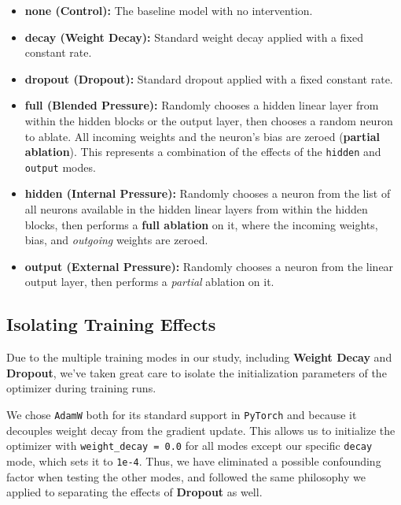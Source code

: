 \documentclass[conference]{IEEEtran}
\begin{document}
\begin{itemize}
    \item \textbf{none (Control):} The baseline model with no intervention.\\
    \item \textbf{decay (Weight Decay):} Standard weight decay applied with a fixed constant rate.\\
    \item \textbf{dropout (Dropout): } Standard dropout applied with a fixed constant rate.\\
    \item \textbf{full (Blended Pressure):} Randomly chooses a hidden linear layer from within the hidden blocks or the output layer, then chooses a random neuron to ablate. All incoming weights and the neuron's bias are zeroed (\textbf{partial ablation}). This represents a combination of the effects of the \verb|hidden| and \verb|output| modes.\\
    \item \textbf{hidden (Internal Pressure):} Randomly chooses a neuron from the list of all neurons available in the hidden linear layers from within the hidden blocks, then performs a \textbf{full ablation} on it, where the incoming weights, bias, and \textit{outgoing} weights are zeroed.\\
    \item \textbf{output (External Pressure):} Randomly chooses a neuron from the linear output layer, then performs a \textit{partial} ablation on it.\\
\end{itemize}

\subsection{Isolating Training Effects}

Due to the multiple training modes in our study, including \textbf{Weight Decay} and \textbf{Dropout}, we've taken great care to isolate the initialization parameters of the optimizer during training runs.

We chose \verb|AdamW| \cite{b11} both for its standard support in \verb|PyTorch| and because it decouples weight decay from the gradient update. This allows us to initialize the optimizer with \verb|weight_decay = 0.0| for all modes except our specific \verb|decay| mode, which sets it to \verb|1e-4|. Thus, we have eliminated a possible confounding factor when testing the other modes, and followed the same philosophy we applied to separating the effects of \textbf{Dropout} as well.
\end{document}
